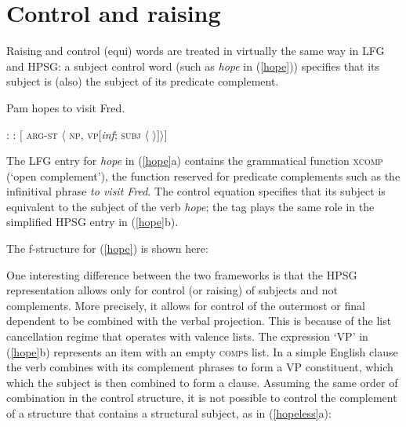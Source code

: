 \section{Control and raising}

Raising and control (equi) words are treated in virtually the same way in LFG and HPSG: a subject control word (such as \textit{hope} in (\ref{hope})) specifies that its subject is (also) the subject of its predicate complement.  

\begin{exe} 
\ex	\label{hope}
Pam hopes to visit Fred.
\begin{xlist} 
\ex	
{}: \qquad {}
\ex 
{}:  \qquad  $[$ \textsc{arg-st} $\langle$ \textsc{np}, \textsc{vp}[\textit{inf}; \textsc{subj} $\langle$  $ \rangle ] \rangle ]$
\end{xlist}
\end{exe}
The LFG entry for \textit{hope} in (\ref{hope}a) contains the grammatical function \textsc{xcomp} (`open complement'), the function reserved for predicate complements such as the infinitival phrase \textit{to visit Fred}.  The control equation specifies that its subject is equivalent to the subject of the verb \textit{hope}; the  tag  plays the same role in the simplified HPSG entry in (\ref{hope}b).  

The f-structure for (\ref{hope}) is shown here:

\begin{exe}
\ex \label{hopefs} 
{
}
\end{exe}

\noindent
One interesting difference between the two frameworks is that the HPSG representation allows only for control (or raising) of subjects and not complements.  More precisely, it allows for control of the outermost or final dependent to be combined with the verbal projection.  This is because of the list cancellation regime that operates with valence lists.  The expression `VP' in  (\ref{hope}b) represents an item with an empty \textsc{comps} list.  In a simple English clause the verb combines with its complement phrases to form a VP constituent, which which the subject is then combined to form a clause.  Assuming the same order of combination in the control structure, it is not possible to control the complement of a structure that contains a structural subject, as in (\ref{hopeless}a):

